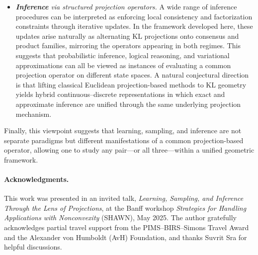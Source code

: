 \documentclass[12pt]{article}
\newcommand{\1}{\mathbb{1}}
\theoremstyle{definition}
\begin{document}
\begin{itemize}[leftmargin=1.5em,itemsep=0.25em]
\item \emph{\textbf{Inference} via structured projection operators.}
A wide range of inference procedures can be interpreted as enforcing local consistency and factorization constraints through iterative updates. In the framework developed here, these updates arise naturally as alternating KL projections onto consensus and product families, mirroring the operators appearing in both regimes. This suggests that probabilistic inference, logical reasoning, and variational approximations can all be viewed as instances of evaluating a common projection operator on different state spaces. A natural conjectural direction is that lifting classical Euclidean projection-based methods to KL geometry yields hybrid continuous--discrete representations in which exact and approximate inference are unified through the same underlying projection mechanism.

\end{itemize}

Finally, this viewpoint suggests that learning, sampling, and inference are not separate paradigms but different manifestations of a common projection-based operator, allowing one to study any pair—or all three—within a unified geometric framework. 



\paragraph{Acknowledgments.}
This work was presented in an invited talk, \emph{Learning, Sampling, and Inference Through the Lens of Projections}, at the Banff workshop \emph{Strategies for Handling Applications with Nonconvexity} (SHAWN), May 2025.
The author gratefully acknowledges partial travel support from the PIMS–BIRS–Simons Travel Award and the Alexander von Humboldt (AvH) Foundation, and thanks Suvrit Sra for helpful discussions.



\end{document}
